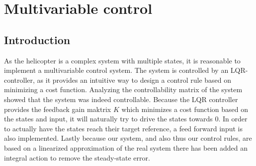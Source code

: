 \section{Multivariable control}
\subsection{Introduction}
As the helicopter is a complex system with multiple states, it is reasonable to implement a multivariable control system.
The system is controlled by an LQR-controller, as it provides an intuitive way to design a control rule based on minimizing a cost function. 
Analyzing the controllability matrix of the system showed that the system was indeed controllable.
Because the LQR controller provides the feedback gain maktrix $K$ which minimizes a cost function based on the states and input, it will naturally try to drive the states towards 0. 
In order to actually have the states reach their target reference, a feed forward input is also implemented. 
Lastly because our system, and also thus our control rules, are based on a linearized approximation of the real system there has been added an integral action to remove the steady-state error.


